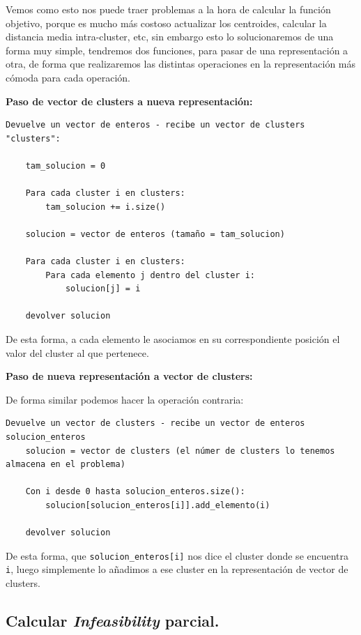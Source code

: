 \documentclass[12pt, spanish]{article}
\begin{document}
Vemos como esto nos puede traer problemas a la hora de calcular la función objetivo, porque es mucho más costoso actualizar los centroides, calcular la distancia media intra-cluster, etc, sin embargo esto lo solucionaremos de una forma muy simple, tendremos dos funciones, para pasar de una representación a otra, de forma que realizaremos las distintas operaciones en la representación más cómoda para cada operación.

\newpage

\textbf{Paso de vector de clusters a nueva representación:}

\begin{lstlisting}
Devuelve un vector de enteros - recibe un vector de clusters "clusters":
	
	tam_solucion = 0
	
	Para cada cluster i en clusters:
		tam_solucion += i.size()
		
	solucion = vector de enteros (tamaño = tam_solucion)
	
	Para cada cluster i en clusters:
		Para cada elemento j dentro del cluster i:
			solucion[j] = i
			
	devolver solucion
\end{lstlisting}

De esta forma, a cada elemento le asociamos en su correspondiente posición el valor del cluster al que pertenece.

\textbf{Paso de nueva representación a vector de clusters:}

De forma similar podemos hacer la operación contraria:

\begin{lstlisting}
Devuelve un vector de clusters - recibe un vector de enteros solucion_enteros
	solucion = vector de clusters (el númer de clusters lo tenemos almacena en el problema)
	
	Con i desde 0 hasta solucion_enteros.size():
		solucion[solucion_enteros[i]].add_elemento(i)
	
	devolver solucion
\end{lstlisting}

De esta forma, que \texttt{solucion\_enteros[i]} nos dice el cluster donde se encuentra \texttt{i}, luego simplemente lo añadimos a ese cluster en la representación de vector de clusters.



\newpage

\subsection{Calcular \textit{Infeasibility} parcial.}
\end{document}

